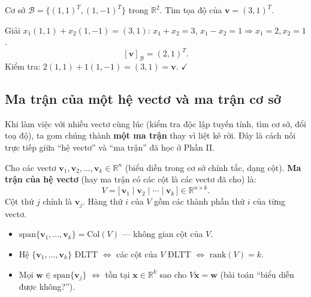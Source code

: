\documentclass[12pt,a4paper]{article}
\begin{document}
\begin{vidu}
Cơ sở $\mathcal{B} = \{(1,1)^T, (1,-1)^T\}$ trong $\mathbb{R}^2$. Tìm tọa độ của $\mathbf{v} = (3,1)^T$.

Giải $x_1(1,1) + x_2(1,-1) = (3,1)$: $x_1 + x_2 = 3$, $x_1 - x_2 = 1 \Rightarrow x_1 = 2, x_2 = 1$.
\[
  [\mathbf{v}]_\mathcal{B} = (2, 1)^T.
\]
Kiểm tra: $2(1,1) + 1(1,-1) = (3,1) = \mathbf{v}$. $\checkmark$
\end{vidu}

\subsection{Ma trận của một hệ vectơ và ma trận cơ sở}

\begin{dongco}
Khi làm việc với nhiều vectơ cùng lúc (kiểm tra độc lập tuyến tính, tìm cơ sở, đổi toạ độ), ta gom chúng thành \textbf{một ma trận} thay vì liệt kê rời. Đây là cách nối trực tiếp giữa ``hệ vectơ'' và ``ma trận'' đã học ở Phần II.
\end{dongco}

\begin{dinhnghia}[title={Ma trận của một hệ vectơ}]
  Cho các vectơ $\mathbf{v}_1, \mathbf{v}_2, \ldots, \mathbf{v}_k \in \mathbb{R}^n$ (biểu diễn trong cơ sở chính tắc, dạng cột). \textbf{Ma trận của hệ vectơ} (hay ma trận có các cột là các vectơ đã cho) là:
  \[
    V = \bigl[\, \mathbf{v}_1 \;\big|\; \mathbf{v}_2 \;\big|\; \cdots \;\big|\; \mathbf{v}_k \,\bigr] \in \mathbb{R}^{n \times k}.
  \]
  Cột thứ $j$ chính là $\mathbf{v}_j$. Hàng thứ $i$ của $V$ gồm các thành phần thứ $i$ của từng vectơ.
\end{dinhnghia}

\begin{ynghia}[title={Ý nghĩa}]
\begin{itemize}
  \item $\mathrm{span}\{\mathbf{v}_1, \ldots, \mathbf{v}_k\} = \mathrm{Col}(V)$ --- không gian cột của $V$.
  \item Hệ $\{\mathbf{v}_1, \ldots, \mathbf{v}_k\}$ ĐLTT $\Leftrightarrow$ các cột của $V$ ĐLTT $\Leftrightarrow$ $\mathrm{rank}(V) = k$.
  \item Mọi $\mathbf{w} \in \mathrm{span}\{\mathbf{v}_j\}$ $\Leftrightarrow$ tồn tại $\mathbf{x} \in \mathbb{R}^k$ sao cho $V\mathbf{x} = \mathbf{w}$ (bài toán ``biểu diễn được không?'').
\end{itemize}
\end{ynghia}
\end{document}
